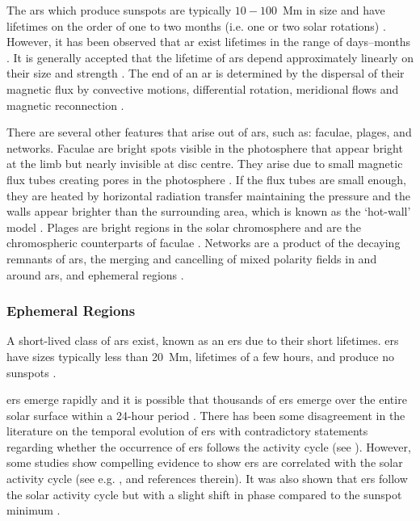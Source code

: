 The \glspl{ar} which produce sunspots are typically $10-100$~Mm in size and have lifetimes on the order of one to two months (i.e. one or two solar rotations) \citep{canfield_solar_2001}. However, it has been observed that \gls{ar} exist lifetimes in the range of days--months \citep{schrijver_solar_2008}. It is generally accepted that the lifetime of \glspl{ar} depend approximately linearly on their size and strength \citep{canfield_solar_2001, schrijver_solar_2008}. The end of an \gls{ar} is determined by the dispersal of their magnetic flux by convective motions, differential rotation, meridional flows and magnetic reconnection \citep{canfield_solar_2001}.


There are several other features that arise out of \glspl{ar}, such as: faculae, plages, and networks. Faculae are bright spots visible in the photosphere that appear bright at the limb but nearly invisible at disc centre. They arise due to small magnetic flux tubes creating pores in the photosphere \citep{solovev_structure_2019}. If the flux tubes are small enough, they are heated by horizontal radiation transfer maintaining the pressure and the walls appear brighter than the surrounding area, which is known as the `hot-wall' model \citep{spruit_pressure_1976, keller_origin_2004}. Plages are bright regions in the solar chromosphere and are the chromospheric counterparts of faculae \citep{pillet_active_1997}. Networks are a product of the decaying remnants of \glspl{ar}, the merging and cancelling of mixed polarity fields in and around \glspl{ar}, and ephemeral regions \citep{martin_identification_1988}.


\subsubsection*{Ephemeral Regions}

A short-lived class of \glspl{ar} exist, known as an \glspl{er} due to their short lifetimes.  \glspl{er} have sizes typically less than 20~Mm, lifetimes of a few hours, and produce no sunspots \citep{harvey_solar_2001}.

\glspl{er} emerge rapidly and it is possible that thousands of \glspl{er} emerge over the entire solar surface within a 24-hour period \citep{harvey_solar_2001}. There has been some disagreement in the literature on the temporal evolution of \glspl{er} with contradictory statements regarding whether the occurrence of \glspl{er} follows the activity cycle (see \citet{harvey_properties_1993, hagenaar_ephemeral_2001, vieira_evolution_2010}). However, some studies show compelling evidence to show \glspl{er} are correlated with the solar activity cycle (see e.g. \citet{vieira_evolution_2010,chaplin_sensitivity_2019}, and references therein). It was also shown that \glspl{er} follow the solar activity cycle but with a slight shift in phase compared to the sunspot minimum \citet{harvey_ephemeral_1973, martin_ephemeral_1979}.

